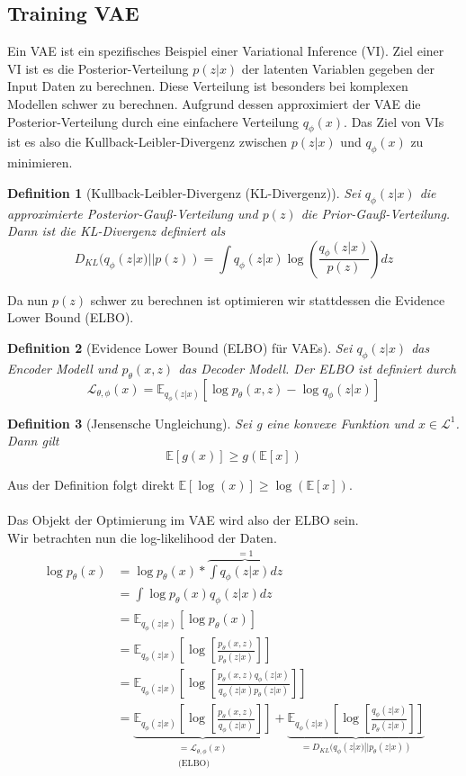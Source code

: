 \documentclass[%
thesis=student,%
coverpage=false,%
titlepage=false,%
headmarks=true, %
german,%
font=libertine, %
math=newpxtx, %
BCOR=5mm,%
coverBCOR=11mm%
]{tumbook}
\theoremstyle{break}
\newtheorem{definition}{Definition}[section]
\begin{document}
\subsection{Training VAE}
Ein VAE ist ein spezifisches Beispiel einer Variational Inference (VI). Ziel einer VI ist es die Posterior-Verteilung $p(z|x)$ der latenten Variablen gegeben der Input Daten zu berechnen. Diese Verteilung ist besonders bei komplexen Modellen schwer zu berechnen. Aufgrund dessen approximiert der VAE die Posterior-Verteilung durch eine einfachere Verteilung $q_\phi(x)$. Das Ziel von VIs ist es also die Kullback-Leibler-Divergenz zwischen $p(z|x)$ und $q_\phi(x)$ zu minimieren. 
\begin{definition}[Kullback-Leibler-Divergenz (KL-Divergenz)]
Sei $q_\phi(z|x)$ die approximierte Posterior-Gauß-Verteilung und $p(z)$ die Prior-Gauß-Verteilung. Dann ist die KL-Divergenz definiert als
$$D_{KL}(q_\phi(z|x)||p(z))= \int q_\phi(z|x) \log \left(\frac{q_\phi(z|x)}{p(z)} \right)dz$$
\end{definition}\noindent
Da nun $p(z)$ schwer zu berechnen ist optimieren wir stattdessen die Evidence Lower Bound (ELBO).
\begin{definition}[Evidence Lower Bound (ELBO) für VAEs]
Sei $q_\phi(z|x)$ das Encoder Modell und $p_\theta(x,z)$ das Decoder Modell. Der ELBO ist definiert durch
$$ \mathcal{L}_{\theta,\phi}(x) = \mathbb{E}_{q_\phi(z|x)}[\log p_\theta(x,z) - \log q_\phi(z|x)] $$ 
\end{definition}\noindent
\begin{definition}[Jensensche Ungleichung]
	Sei g eine konvexe Funktion und  $x\in \mathcal{L^1}$. Dann gilt
	$$ \mathbb{E}[g(x)] \geq g(\mathbb{E}[x]) $$ 
\end{definition} \noindent
Aus der Definition folgt direkt $ \mathbb{E}[\log(x)] \geq \log(\mathbb{E}[x]) $.\\
\\
Das Objekt der Optimierung im VAE wird also der ELBO sein. \\
Wir betrachten nun die log-likelihood der Daten.\\
\begin{align}
 	\log p_\theta(x) &= \log p_\theta(x) * \overbrace{\int q_\phi(z|x) dz}^{=1} \\
 	&= \int \log p_\theta(x) q_\phi(z|x) dz \\
 	&= \mathbb{E}_{q_\phi(z|x)}[\log p_\theta(x)] \\
 	&= \mathbb{E}_{q_\phi(z|x)}\left[\log\left[ \frac{p_\theta(x,z)}{p_\theta(z|x)}\right]\right] \\
 	&= \mathbb{E}_{q_\phi(z|x)}\left[\log\left[ \frac{p_\theta(x,z)q_\phi(z|x)}{q_\phi(z|x)p_\theta(z|x)}\right]\right] \\
 	&= \underbrace{\mathbb{E}_{q_\phi(z|x)}\left[\log\left[ \frac{p_\theta(x,z)}{q_\phi(z|x)}\right]\right]}_{\substack{\text{$= \mathcal{L}_{\theta,\phi}(x)$}\\\text{(ELBO)}}} + \underbrace{\mathbb{E}_{q_\phi(z|x)}\left[\log\left[ \frac{q_\phi(z|x)}{p_\theta(z|x)}\right]\right]}_{=D_{KL}(q_\phi(z|x)||p_\theta(z|x))}
\end{align}
\end{document}
